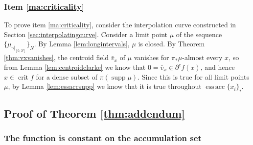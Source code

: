\documentclass[11pt]{article}
\theoremstyle{definition}
\theoremstyle{remark}
\DeclareMathOperator{\supp}{supp}
\DeclareMathOperator{\crit}{crit}
\DeclareMathOperator{\essacc}{ess\,acc}
\newcommand{\meas}[2]{\mu_{#1|_{#2}}}
\begin{document}
\subsubsection{Item \ref{ma:criticality}}
\label{sec:proofmain2}

To prove item \ref{ma:criticality}, consider the interpolation curve constructed in Section \ref{sec:interpolatingcurve}. 
Consider a limit point $\mu$ of the sequence $\{\meas{\gamma}{[0,N]}\}_N$. By Lemma \ref{lem:longintervals}, $\mu$ is closed.
By Theorem \ref{thm:vxvanishes}, the centroid field $\bar v_x$ of $\mu$ vanishes for $\pi_*\mu$-almost every $x$, so from Lemma \ref{lem:centroidclarke} we know that $0=\bar v_x\in\partial^cf(x)$, and hence $x\in \crit f$ for a dense subset of $\pi(\supp\mu)$. Since this is true for all limit points $\mu$, by Lemma \ref{lem:essaccsupp} we know that it is true throughout $\essacc\{x_i\}_i$.



\subsection{Proof of Theorem \ref{thm:addendum}}
\label{sec:proofaddendum}
%
%
%
%
%
%
%
%
%
%
%
%
 
%
%
 
%
%
%
%
%
%

%
%
%
%
%
%
%
%
%
%
%
%
%
%
%


%

 \subsubsection{The function is constant on the accumulation set}
 \label{sec:accset}
 
\end{document}
